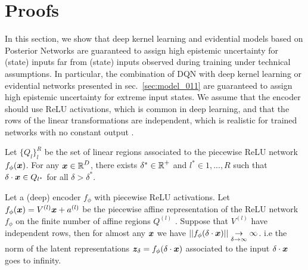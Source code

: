 \appendix


\section{Proofs}
\label{app:proofs}

In this section, we show that deep kernel learning \cite{due} and evidential models based on Posterior Networks \cite{charpentier2020, natpn}  are guaranteed to assign high epistemic uncertainty for (state) inputs far from (state) inputs observed during training under technical assumptions. In particular, the combination of DQN with deep kernel learning or evidential networks presented in sec.~\ref{sec:model_011} are guaranteed to assign high epistemic uncertainty for extreme input states. We assume that the encoder should use ReLU activations, which is common in deep learning, and that the rows of the linear transformations are independent, which is realistic for trained networks with no constant output \citep{overconfident-relu}.

\begin{lemma}
\label{lem:relu-regions_011}
\cite{understanding-nn-relu} Let $\{Q_l\}_l^{R}$ be the set of linear regions associated to the piecewise ReLU network $f_{\phi}(\bm{x})$. For any $\bm{x} \in \operatorname{\mathbb{R}}^D$, there exists $\delta^* \in \operatorname{\mathbb{R}}^{+}$ and $l^*\in {1,..., R}$ such that $\delta \cdot \bm{x} \in Q_{l^*}$ for all $\delta > \delta^*$.
\end{lemma}

\begin{lemma}
\label{lem:asymptotic-latent-norm}
Let a (deep) encoder $f_{\phi}$ with piecewise ReLU activations. Let $f_{\phi}(\bm{x})= V^{(l)}\bm{x} + a^{(l)}$ be the piecewise affine representation of the ReLU network $f_{\phi}$ on the finite number of affine regions $Q^{(l)}$ \citep{understanding-nn-relu}. Suppose that $V^{(l)}$ have independent rows, then for almost any $\bm{x}$ we have $|| f_{\phi}(\delta \cdot \bm{x}) || \underset{\delta \rightarrow \infty}{\rightarrow} \infty$. i.e the norm of the latent representations $\bm{z}_\delta=f_{\phi}(\delta \cdot \bm{x})$ associated to the input $\delta \cdot \bm{x}$ goes to infinity.
\end{lemma}

